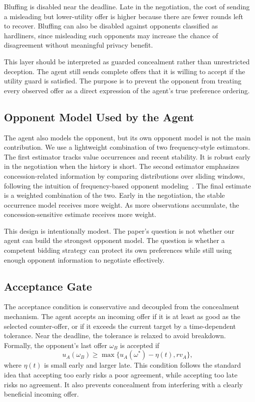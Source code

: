 \documentclass[runningheads]{llncs}
\begin{document}
Bluffing is disabled near the deadline. Late in the negotiation, the cost of sending a misleading but lower-utility offer is higher because there are fewer rounds left to recover. Bluffing can also be disabled against opponents classified as hardliners, since misleading such opponents may increase the chance of disagreement without meaningful privacy benefit.

This layer should be interpreted as guarded concealment rather than unrestricted deception. The agent still sends complete offers that it is willing to accept if the utility guard is satisfied. The purpose is to prevent the opponent from treating every observed offer as a direct expression of the agent's true preference ordering.

\subsection{Opponent Model Used by the Agent}

The agent also models the opponent, but its own opponent model is not the main contribution. We use a lightweight combination of two frequency-style estimators. The first estimator tracks value occurrences and recent stability. It is robust early in the negotiation when the history is short. The second estimator emphasizes concession-related information by comparing distributions over sliding windows, following the intuition of frequency-based opponent modeling~\cite{rethinkfrequency}. The final estimate is a weighted combination of the two. Early in the negotiation, the stable occurrence model receives more weight. As more observations accumulate, the concession-sensitive estimate receives more weight.

This design is intentionally modest. The paper's question is not whether our agent can build the strongest opponent model. The question is whether a competent bidding strategy can protect its own preferences while still using enough opponent information to negotiate effectively.

\subsection{Acceptance Gate}

The acceptance condition is conservative and decoupled from the concealment mechanism. The agent accepts an incoming offer if it is at least as good as the selected counter-offer, or if it exceeds the current target by a time-dependent tolerance. Near the deadline, the tolerance is relaxed to avoid breakdown. Formally, the opponent's last offer $\omega_B$ is accepted if
\begin{equation}
 u_A(\omega_B) \geq \max\{u_A(\omega^*) - \eta(t), rv_A\},
\label{eq:accept}
\end{equation}
where $\eta(t)$ is small early and larger late. This condition follows the standard idea that accepting too early risks a poor agreement, while accepting too late risks no agreement. It also prevents concealment from interfering with a clearly beneficial incoming offer.
\end{document}
